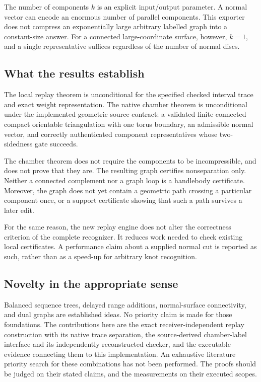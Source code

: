 The number of components \(k\) is an explicit input/output parameter. A
normal vector can encode an enormous number of parallel components. This
exporter does not compress an exponentially large arbitrary labelled graph
into a constant-size answer. For a connected large-coordinate surface,
however, \(k=1\), and a single representative suffices regardless of the
number of normal discs.

\subsection{What the results establish}

The local replay theorem is unconditional for the specified checked
interval trace and exact weight representation. The native chamber theorem
is unconditional under the implemented geometric source contract:
a validated finite connected compact orientable triangulation with one
torus boundary, an admissible normal vector, and correctly authenticated
component representatives whose two-sidedness gate succeeds.

The chamber theorem does not require the components to be incompressible,
and does not prove that they are. The resulting graph certifies
nonseparation only. Neither a connected complement nor a graph loop is a
handlebody certificate. Moreover, the graph does not yet contain a
geometric path crossing a particular component once, or a support
certificate showing that such a path survives a later edit.

For the same reason, the new replay engine does not alter the correctness
criterion of the complete recognizer. It reduces work needed to check
existing local certificates. A performance claim about a supplied normal
cut is reported as such, rather than as a speed-up for arbitrary knot
recognition.

\subsection{Novelty in the appropriate sense}

Balanced sequence trees, delayed range additions, normal-surface
connectivity, and dual graphs are established ideas. No priority claim is
made for those foundations. The contributions here are the exact
receiver-independent replay construction with its native trace separation,
the source-derived chamber-label interface and its independently reconstructed
checker, and the executable evidence connecting them to this implementation.
An exhaustive literature priority search for these combinations has not
been performed. The proofs should be judged on their stated claims, and the
measurements on their executed scopes.

